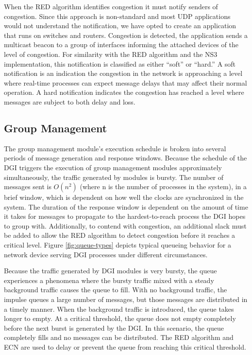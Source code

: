 When the \ac{RED} algorithm identifies congestion it must notify senders of congestion.
Since this approach is non-standard and most UDP applications would not understand the notification, we have opted to create an application that runs on switches and routers.
Congestion is detected, the application sends a multicast beacon to a group of interfaces informing the attached devices of the level of congestion.
For similarity with the \ac{RED} algorithm and the \ac{NS3} implementation, this notification is classified as either ``soft'' or ``hard.''
A soft notification is an indication the congestion in the network is approaching a level where real-time processes can expect message delays that may affect their normal operation.
A hard notification indicates the congestion has reached a level where messages are subject to both delay and loss.

\subsection{Group Management}

The group management module's execution schedule is broken into several periods of message generation and response windows.
Because the schedule of the \ac{DGI} triggers the execution of group management modules approximately simultaneously, the traffic generated by modules is bursty.
The number of messages sent is $O(n^2)$ (where n is the number of processes in the system), in a brief window, which is dependent on how well the clocks are synchronized in the system.
The duration of the response window is dependent on the amount of time it takes for messages to propagate to the hardest-to-reach process the \ac{DGI} hopes to group with.
Additionally, to contend with congestion, an additional slack must be added to allow the \ac{RED} algorithm to detect congestion before it reaches a critical level.
Figure \ref{fig:queue-types} depicts typical queueing behavior for a network device serving \ac{DGI} processes under different circumstances.

Because the traffic generated by \ac{DGI} modules is very bursty, the queue experiences a phenomena where the bursty traffic mixed with a steady background traffic causes the queue to fill.
With no background traffic, the impulse queues a large number of messages, but those messages are distributed in a timely manner.
When the background traffic is introduced, the queue takes longer to empty.
At a critical threshold, the queue does not empty completely before the next burst is generated by the \ac{DGI}.
In this scenario, the queue completely fills and no messages can be distributed.
The \ac{RED} algorithm and \ac{ECN} are used to delay or prevent the queue from reaching this critical threshold.

